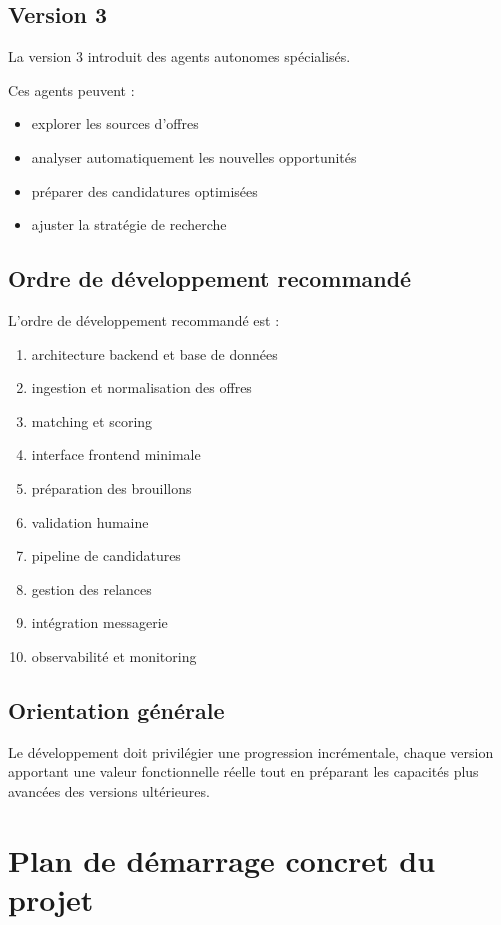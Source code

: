 \documentclass[11pt,a4paper]{article}
\begin{document}
\subsection{Version 3}

La version 3 introduit des agents autonomes spécialisés.

Ces agents peuvent :

\begin{itemize}
\item explorer les sources d’offres
\item analyser automatiquement les nouvelles opportunités
\item préparer des candidatures optimisées
\item ajuster la stratégie de recherche
\end{itemize}

\subsection{Ordre de développement recommandé}

L’ordre de développement recommandé est :

\begin{enumerate}
\item architecture backend et base de données
\item ingestion et normalisation des offres
\item matching et scoring
\item interface frontend minimale
\item préparation des brouillons
\item validation humaine
\item pipeline de candidatures
\item gestion des relances
\item intégration messagerie
\item observabilité et monitoring
\end{enumerate}

\subsection{Orientation générale}

Le développement doit privilégier une progression incrémentale, chaque version apportant une valeur fonctionnelle réelle tout en préparant les capacités plus avancées des versions ultérieures.

\section{Plan de démarrage concret du projet}
\end{document}
